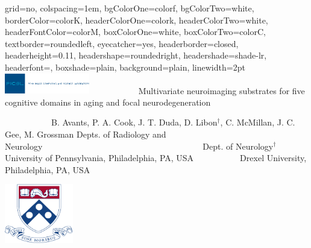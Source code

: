 \documentclass[paperwidth=48in,paperheight=48in,portrait,final]{tex/baposter}
\begin{document}
\newlength{\leftimgwidth}
\begin{poster}%
  {
  grid=no,
  colspacing=1em,
  bgColorOne=colorf,
  bgColorTwo=white,
  borderColor=colorK,
  headerColorOne=colork,
  headerColorTwo=white,
  headerFontColor=colorM,
  boxColorOne=white,
  boxColorTwo=colorC,
  textborder=roundedleft,
  eyecatcher=yes,
  headerborder=closed,
  headerheight=0.11\textheight,
  headershape=roundedright,
  headershade=shade-lr,
  headerfont=\Large, %
  boxshade=plain,
  background=plain,
  linewidth=2pt
  }
  {\includegraphics[width=10em]{figures/picslsquare}} %
  { %
~~~~~~~~~~~Multivariate neuroimaging substrates for five cognitive domains
in aging and focal neurodegeneration
  \vspace{0.1em}}
  { %
  ~~~~~~~~~~~B. Avants, P. A. Cook, J. T. Duda, D. Libon$^\dagger$,
  C. McMillan, J. C. Gee, M. Grossman
  \vspace{0.2em}
{\normalsize \newline Depts. of Radiology and Neurology~~~~~~~~~~~~~~~~~~~~~~~~~~~~~~~~~~~~~~Dept. of Neurology$^\dagger$ \\
  University of Pennsylvania, Philadelphia, PA, USA~~~~~~~~~~~Drexel University, Philadelphia, PA, USA
  }
  
  }
  {%
      \begin{minipage}{16em}
        \hfill
        \includegraphics[height=7.0em]{figures/pennshield}
      \end{minipage}
  }


\end{poster}
\end{document}
